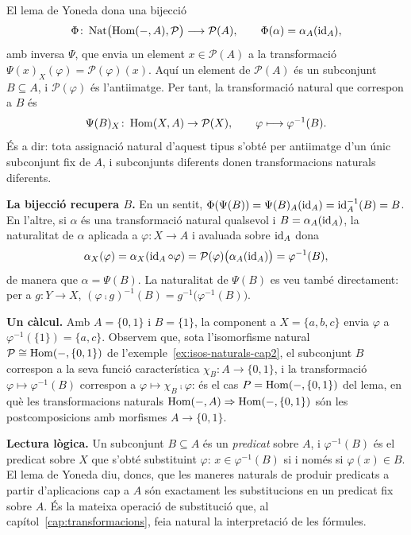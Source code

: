 \begin{solucio}
El lema de Yoneda dona una bijecció
\[
\Phi\colon\operatorname{Nat}\bigl(\operatorname{Hom}(-,A),\mathcal P\bigr)\longrightarrow\mathcal P(A),
\qquad
\Phi(\alpha)=\alpha_A(\operatorname{id}_A),
\]
amb inversa $\Psi$, que envia un element $x\in\mathcal P(A)$ a la transformació $\Psi(x)_X(\varphi)=\mathcal P(\varphi)(x)$. Aquí un element de $\mathcal P(A)$ és un subconjunt $B\subseteq A$, i $\mathcal P(\varphi)$ és l'antiimatge. Per tant, la transformació natural que correspon a $B$ és
\[
\Psi(B)_X\colon\operatorname{Hom}(X,A)\to\mathcal P(X),
\qquad
\varphi\longmapsto\varphi^{-1}(B).
\]
És a dir: tota assignació natural d'aquest tipus s'obté per antiimatge d'un únic subconjunt fix de $A$, i subconjunts diferents donen transformacions naturals diferents.

\textbf{La bijecció recupera $B$.} En un sentit, $\Phi(\Psi(B))=\Psi(B)_A(\operatorname{id}_A)=\operatorname{id}_A^{-1}(B)=B$. En l'altre, si $\alpha$ és una transformació natural qualsevol i $B=\alpha_A(\operatorname{id}_A)$, la naturalitat de $\alpha$ aplicada a $\varphi\colon X\to A$ i avaluada sobre $\operatorname{id}_A$ dona
\[
\alpha_X(\varphi)=\alpha_X(\operatorname{id}_A\circ\varphi)=\mathcal P(\varphi)\bigl(\alpha_A(\operatorname{id}_A)\bigr)=\varphi^{-1}(B),
\]
de manera que $\alpha=\Psi(B)$. La naturalitat de $\Psi(B)$ es veu també directament: per a $g\colon Y\to X$, $(\varphi\comp g)^{-1}(B)=g^{-1}\bigl(\varphi^{-1}(B)\bigr)$.

\textbf{Un càlcul.} Amb $A=\{0,1\}$ i $B=\{1\}$, la component a $X=\{a,b,c\}$ envia $\varphi$ a $\varphi^{-1}(\{1\})=\{a,c\}$. Observem que, sota l'isomorfisme natural $\mathcal P\cong\operatorname{Hom}(-,\{0,1\})$ de l'exemple~\ref{ex:isos-naturals-cap2}, el subconjunt $B$ correspon a la seva funció característica $\chi_B\colon A\to\{0,1\}$, i la transformació $\varphi\mapsto\varphi^{-1}(B)$ correspon a $\varphi\mapsto\chi_B\comp\varphi$: és el cas $P=\operatorname{Hom}(-,\{0,1\})$ del lema, en què les transformacions naturals $\operatorname{Hom}(-,A)\Rightarrow\operatorname{Hom}(-,\{0,1\})$ són les postcomposicions amb morfismes $A\to\{0,1\}$.

\textbf{Lectura lògica.} Un subconjunt $B\subseteq A$ és un \emph{predicat} sobre $A$, i $\varphi^{-1}(B)$ és el predicat sobre $X$ que s'obté substituint $\varphi$: $x\in\varphi^{-1}(B)$ si i només si $\varphi(x)\in B$. El lema de Yoneda diu, doncs, que les maneres naturals de produir predicats a partir d'aplicacions cap a $A$ són exactament les substitucions en un predicat fix sobre $A$. És la mateixa operació de substitució que, al capítol~\ref{cap:transformacions}, feia natural la interpretació de les fórmules.
\end{solucio}

